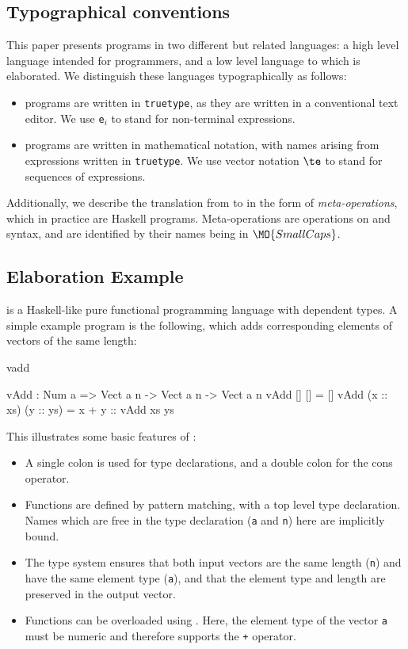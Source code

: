 \subsection{Typographical conventions}

This paper presents programs in two different but related languages: a high level
language \Idris{} intended for programmers, and a low level language \TT{} to
which \Idris{} is elaborated. We distinguish these languages typographically as
follows:

\begin{itemize}
\item \Idris{} programs are written in \texttt{truetype}, as they are written
in a conventional text editor. We use \texttt{e$_i$} to stand for non-terminal
expressions.
\item \TT{} programs are written in mathematical notation, with names arising
from \Idris{} expressions written in \texttt{truetype}. We use vector notation
$\te$ to stand for sequences of expressions.
\end{itemize}

Additionally, we describe the translation from \Idris{} to \TT{} in the form
of \emph{meta-operations}, which in practice are Haskell programs. Meta-operations
are operations on \Idris{} and \TT{} syntax, and are identified by their names being
in $\MO{SmallCaps}$.

\subsection{Elaboration Example}

\Idris{} is a Haskell-like pure functional programming language with dependent types.
A simple example program is the following, which adds corresponding elements of
vectors of the same length:

\begin{SaveVerbatim}{vadd}

vAdd : Num a => Vect a n -> Vect a n -> Vect a n
vAdd []        []        = []
vAdd (x :: xs) (y :: ys) = x + y :: vAdd xs ys

\end{SaveVerbatim}

\noindent
This illustrates some basic features of \Idris{}:

\begin{itemize}
\item A single colon is used for type declarations, and a double colon for the
cons operator.
\item Functions are defined by pattern matching, with a top level type declaration.
Names which are free in the type declaration (\texttt{a} and \texttt{n}) here
are implicitly bound.
\item The type system ensures that both input vectors are the same length (\texttt{n})
and have the same element type (\texttt{a}), and that the element type and length
are preserved in the output vector.
\item Functions can be overloaded using . Here, the element type
of the vector \texttt{a} must be numeric and therefore supports the \texttt{+} operator.
\end{itemize}

